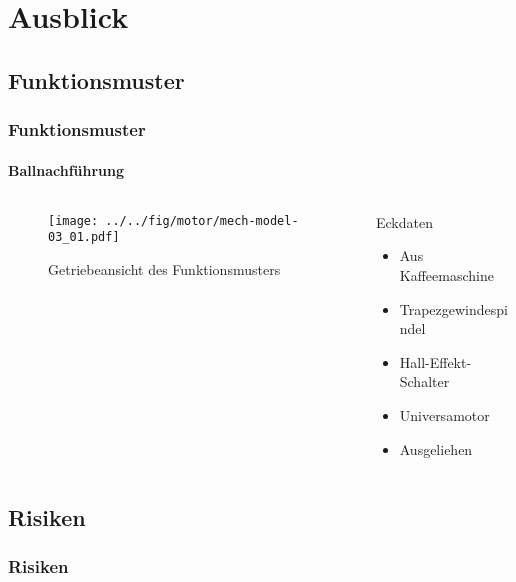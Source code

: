 \section{Ausblick}

\subsection{Funktionsmuster}
\begin{frame}
	\frametitle{Funktionsmuster\hfill{}\footnotesize \group}
	\framesubtitle{Ballnachführung}
	\begin{columns}
		\begin{column}{0.5\textwidth}
			\begin{figure}
				\texttt{[image: ../../fig/motor/mech-model-03\_01.pdf]}
				\caption{Getriebeansicht des Funktionsmusters}
			\end{figure}
		\end{column}
		\begin{column}{0.5\textwidth}
			\begin{block}{Eckdaten}
				\begin{itemize}
					\item Aus Kaffeemaschine
					\item Trapezgewindespindel
					\item Hall-Effekt-Schalter
					\item Universamotor
					\item Ausgeliehen
				\end{itemize}
			\end{block}
		\end{column}
	\end{columns}
\end{frame}

\subsection{Risiken}
\begin{frame}
	\frametitle{Risiken \hfill{} \footnotesize \group}

\end{frame}
